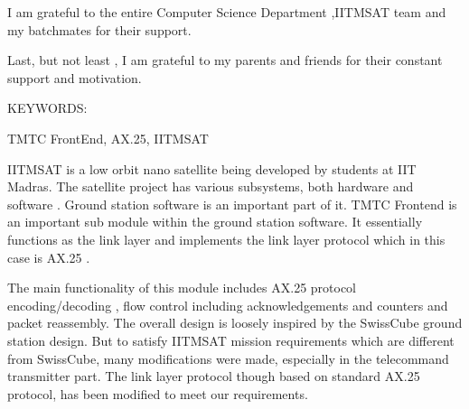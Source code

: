 \documentclass[BTech]{iitmdiss}
\begin{document}
\par I am grateful to the entire Computer Science Department ,IITMSAT team and my batchmates for their support.

\par Last, but not least , I am grateful to my parents and friends for their constant support and motivation. 


\abstract

\noindent KEYWORDS: \hspace*{0.5em} \parbox[t]{4.4in}{TMTC FrontEnd,
AX.25, IITMSAT}

\vspace*{24pt}

IITMSAT is a low orbit nano satellite being developed by students at IIT Madras. The satellite project has various subsystems, both hardware and software . Ground station software is an important part of it. TMTC Frontend is an important sub module within the ground station software. It essentially functions as the link layer and implements the link layer protocol which in this case is AX.25 .
\par The main functionality of this module includes AX.25 protocol encoding/decoding , flow control including acknowledgements and counters and packet reassembly. The overall design is loosely inspired by the SwissCube ground station design. But to satisfy IITMSAT mission requirements which are different from SwissCube, many modifications were made, especially in the telecommand transmitter part. The link layer protocol though based on standard AX.25 protocol, has been modified to meet our requirements. 


\pagebreak


\begin{singlespace}
\tableofcontents
\thispagestyle{empty}

\listoffigures
{}
\end{singlespace}


\abbreviations
 
\end{document}
